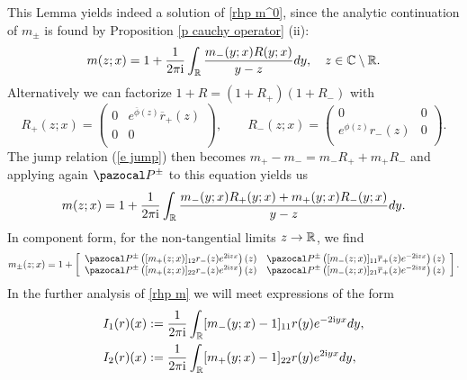 This Lemma yields indeed a solution of \rh \ref{rhp m^0}, since the analytic continuation of $m_{\pm}$ is found by Proposition \ref{p cauchy operator} (ii):
\begin{equation}\label{e RHP solution formula}
    m(z;x)=1+\frac{1}{2\pi\mathrm{i}}\int_{\mathbb R} \frac{m_-(y;x)R(y;x)}{y-z}dy,\quad z\in\mathbb C\setminus \mathbb R.
\end{equation}
Alternatively we can factorize $1+R=(1+R_+)(1+R_-)$ with
\begin{equation}\label{e def R+ and R-}
    R_+(z;x)=
    \left(
      \begin{array}{cc}
            0 & e^{\overline{\phi}(z)}\overline{r}_+(z) \\
            0 & 0 \\
      \end{array}
    \right),\qquad
    R_-(z;x)=
    \left(
      \begin{array}{cc}
            0 & 0 \\
            e^{\phi(z)}r_-(z) & 0 \\
      \end{array}
    \right).
\end{equation}
The jump relation (\ref{e jump}) then becomes $m_+ -m_-=m_-R_+ +m_+R_-$ and applying again $\Ppm$ to this equation yields us
\begin{equation}\label{e alternative RHP solution formula}
    m(z;x)=1+\frac{1}{2\pi\mathrm{i}}\int_{\mathbb R} \frac{m_-(y;x)R_+(y;x)+ m_+(y;x)R_-(y;x)}{y-z}dy.
\end{equation}
In component form, for the non-tangential limits $z\to\mathbb R$, we find
\begin{equation}\label{e component RHP solution formula}
    m_{\pm}(z;x)=1+
    \left[
      \begin{array}{cc}
        \Ppm\left([m_+(z;x)]_{12} r_-(z) e^{2\ii zx}\right)(z) & \Ppm\left([m_-(z;x)]_{11} \overline{r}_+(z) e^{-2\ii zx}\right)(z) \\
        \Ppm\left([m_+(z;x)]_{22} r_-(z) e^{2\ii zx}\right)(z) & \Ppm\left([m_-(z;x)]_{21} \overline{r}_+(z) e^{-2\ii zx}\right)(z) \\
      \end{array}
    \right].
\end{equation}
In the further analysis of \rh \ref{rhp m} we will meet expressions of the form
\begin{equation}\label{e def I_1,2}
    \begin{aligned}
        &I_1(r)(x):=\frac{1}{2\pi\mathrm{i}} \int_{\mathbb R}[m_-(y;x)-1]_{11} r(y) e^{-2\mathrm{i} yx}dy,\\
        &I_2(r)(x):=\frac{1}{2\pi\mathrm{i}} \int_{\mathbb R}[m_+(y;x)-1]_{22}r(y) e^{2\mathrm{i} yx}dy,
    \end{aligned}
\end{equation}
